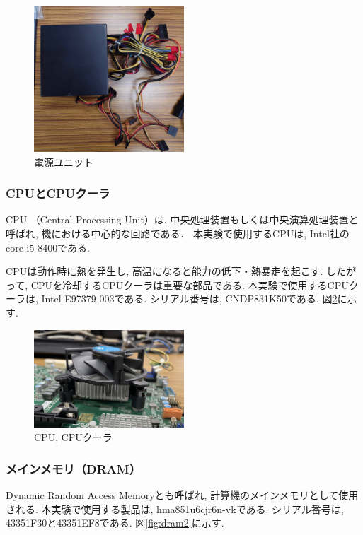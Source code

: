 \documentclass{ltjsarticle} %
\begin{document}
\begin{figure}[H] %
  \centering
  \includegraphics[width=0.5\textwidth]{dengen3.jpg} %
  \caption{電源ユニット} %
  \label{fig:dengen3} %
\end{figure}


\subsubsection{CPUとCPUクーラ}
CPU （Central Processing Unit）は, 中央処理装置もしくは中央演算処理装置と呼ばれ, 機における中⼼的な回路である．
本実験で使用するCPUは, Intel社のcore i5-8400である. 

CPUは動作時に熱を発⽣し, ⾼温になると能⼒の低下・熱暴⾛を起こす.
したがって, CPUを冷却するCPUクーラは重要な部品である.
本実験で使用するCPUクーラは, Intel E97379-003である. シリアル番号は, CNDP831K50である. 図\ref{fig:cpufan}に示す.

\begin{figure}[H] %
  \centering
  \includegraphics[width=0.5\textwidth]{cpufan.jpg} %
  \caption{CPU, CPUクーラ} %
  \label{fig:cpufan} %
\end{figure}


\subsubsection{メインメモリ（DRAM）}
Dynamic Random Access Memoryとも呼ばれ, 計算機のメインメモリとして使⽤される.
本実験で使用する製品は,  hma851u6cjr6n-vkである. シリアル番号は, 43351F30と43351EF8である. 図\ref{fig:dram2}に示す. 
\end{document}

